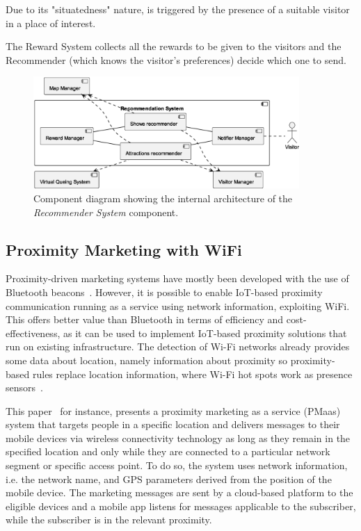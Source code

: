 Due to its "situatedness" nature, is triggered by the presence of a suitable visitor in a place of interest.

The Reward System collects all the rewards to be given to the visitors and the Recommender (which knows the visitor's preferences)
decide which one to send.

\begin{figure}[H]
	\centering
	\includegraphics[width=0.9\textwidth]{img/recommender.eps}
	\caption{Component diagram showing the internal architecture of the \textit{Recommender System} component.
	}
	\label{fig:recommender-arch}
\end{figure}

\subsection{Proximity Marketing with WiFi}\label{subsec:technologies-for-proximity-marketing}
Proximity-driven marketing systems have mostly been developed with the use of Bluetooth beacons~\cite{mndebele2017iot}.
However, it is possible to enable IoT-based proximity communication running as a service using network information, exploiting WiFi.
This offers better value than Bluetooth in terms of efficiency and cost-effectiveness, as it can be used to implement IoT-based proximity solutions that run on existing infrastructure.
The detection of Wi-Fi networks already provides some data about location, namely information about proximity so
proximity-based rules replace location information, where Wi-Fi hot spots work as presence sensors~\cite{dmitry2013network}.

This paper~\cite{mndebele2017iot} for instance, presents a proximity marketing as a service (PMaas) system that targets people in a specific location and delivers messages to their mobile devices via wireless connectivity technology as long as they remain in the specified location and only while they are connected to a particular network segment or specific access point.
To do so, the system uses network information, i.e. the network name, and GPS parameters derived from the position of the mobile device.
The marketing messages are sent by a cloud-based platform to the eligible devices and a mobile app listens for messages
applicable to the subscriber, while the subscriber is in the relevant proximity.



